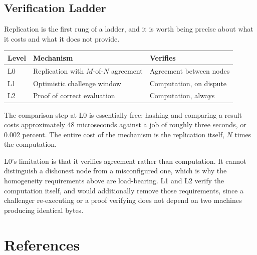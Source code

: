 \documentclass[12pt,a4paper]{article}
\begin{document}
\subsection{Verification Ladder}

Replication is the first rung of a ladder, and it is worth being precise about what it costs and what it does not provide.

\begin{center}
\begin{tabular}{lll}
\hline
Level & Mechanism & Verifies \\
\hline
L0 & Replication with $M$-of-$N$ agreement & Agreement between nodes \\
L1 & Optimistic challenge window & Computation, on dispute \\
L2 & Proof of correct evaluation & Computation, always \\
\hline
\end{tabular}
\end{center}

The comparison step at L0 is essentially free: hashing and comparing a result costs approximately 48 microseconds against a job of roughly three seconds, or 0.002 percent.
The entire cost of the mechanism is the replication itself, $N$ times the computation.

L0's limitation is that it verifies agreement rather than computation.
It cannot distinguish a dishonest node from a misconfigured one, which is why the homogeneity requirements above are load-bearing.
L1 and L2 verify the computation itself, and would additionally remove those requirements, since a challenger re-executing or a proof verifying does not depend on two machines producing identical bytes.

\section{References}


\end{document}
